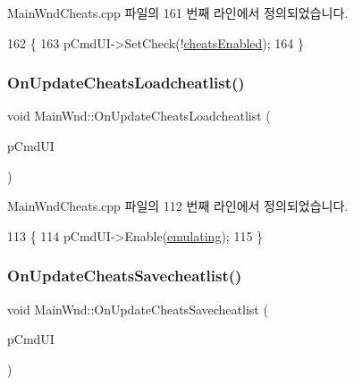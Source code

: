 Main\+Wnd\+Cheats.\+cpp 파일의 161 번째 라인에서 정의되었습니다.


\begin{DoxyCode}
162 \{
163   pCmdUI->SetCheck(!\mbox{\hyperlink{gb_cheats_8cpp_a77d9fae8175282841c0cdda4dd1dc24a}{cheatsEnabled}});
164 \}
\end{DoxyCode}
\mbox{\label{class_main_wnd_a1afd028f12bc4f140adbf5cd052b62f4}} 
\subsubsection{\texorpdfstring{On\+Update\+Cheats\+Loadcheatlist()}{OnUpdateCheatsLoadcheatlist()}}
{\footnotesize\ttfamily void Main\+Wnd\+::\+On\+Update\+Cheats\+Loadcheatlist (\begin{DoxyParamCaption}\item[{C\+Cmd\+UI $\ast$}]{p\+Cmd\+UI }\end{DoxyParamCaption})\hspace{0.3cm}{\ttfamily [protected]}}



Main\+Wnd\+Cheats.\+cpp 파일의 112 번째 라인에서 정의되었습니다.


\begin{DoxyCode}
113 \{
114   pCmdUI->Enable(\mbox{\hyperlink{_main_wnd_cheats_8cpp_af9cc36078b1b311753963297ae7f2a74}{emulating}});
115 \}
\end{DoxyCode}
\mbox{\label{class_main_wnd_ae49480ad4a8f36b444eef64f77f65806}} 
\subsubsection{\texorpdfstring{On\+Update\+Cheats\+Savecheatlist()}{OnUpdateCheatsSavecheatlist()}}
{\footnotesize\ttfamily void Main\+Wnd\+::\+On\+Update\+Cheats\+Savecheatlist (\begin{DoxyParamCaption}\item[{C\+Cmd\+UI $\ast$}]{p\+Cmd\+UI }\end{DoxyParamCaption})\hspace{0.3cm}{\ttfamily [protected]}}




